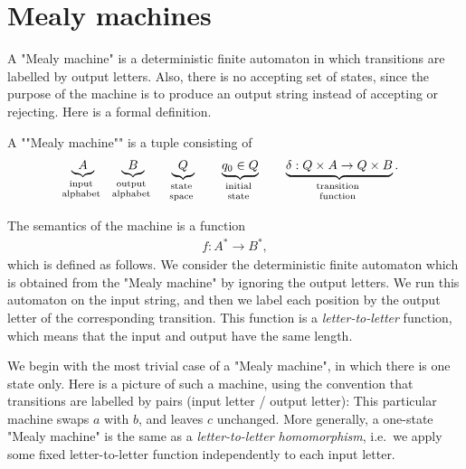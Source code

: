 \section{Mealy machines}
\label{sec:mealy-machines}
A "Mealy machine" is a deterministic finite automaton in which transitions are labelled by output letters. Also, there is no accepting set of states, since the purpose of the machine is to produce an output string instead of accepting or rejecting. Here is a formal definition.

\begin{definition}\label{def:mealy-machine}
    A ""Mealy machine"" is a tuple consisting of 
    \begin{align*}
    \myunderbrace{A}{input \\ alphabet}
    \qquad 
    \myunderbrace{B}{output \\ alphabet}
    \qquad
    \myunderbrace{Q}{state \\ space}
    \qquad
    \myunderbrace{q_0 \in Q}{initial \\ state}
    \qquad
    \myunderbrace{\delta : Q \times A \to Q \times B}{transition \\ function}.
    \end{align*}
\end{definition}

The semantics of the machine is a function 
\begin{align*}
f : A^* \to B^*,
\end{align*}
which is defined as follows. We consider the deterministic finite automaton which is obtained from the "Mealy machine" by ignoring the output letters. We run this automaton on the input string, and then we label each position by the output letter of the corresponding transition. This function is a \emph{letter-to-letter} function, which means that the input and output have the same length. 

\begin{myexample}
     We begin with the most trivial case of a "Mealy machine", in which there is one state only. Here is a picture of such a machine, using the convention that transitions are labelled by pairs (input letter / output letter):
    This particular machine swaps $a$ with $b$, and leaves $c$ unchanged. More generally, a one-state "Mealy machine" is the same as a \emph{letter-to-letter homomorphism}, i.e.~we apply some fixed letter-to-letter function independently to each input letter.
\end{myexample}

